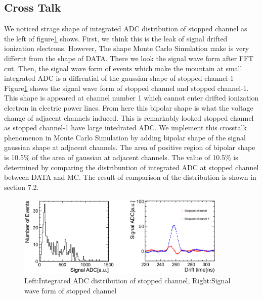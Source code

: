 \subsection{Cross Talk}

We noticed strage shape of integrated ADC distribution of stopped channel
as the left of figure\ref{cross_talk} shows.
First, we think this is the leak of signal drifted ionization electrons.
However, The shape Monte Carlo Simulation make is very differnt from the shape of DATA.
There we look the signal wave form after FFT cut.
Then, the signal wave form of events which make the mountain
at small integrated ADC is a diffrential of the gaussian shape of stopped channel-1
Figure\ref{cross_talk} shows the signal wave form of stopped channel and stopped channel-1.
This shape is appeared at channel number 1 which cannot enter drifted ionization electron in electric power lines.
From here this bipolar shape is what the voltage change of adjacent channels induced.
This is remarkably looked stopped channel as stopped channel-1 have large intedrated ADC.
We implement this crosstalk phenomenon in Monte Carlo Simulation
by adding bipolar shape of the signal gaussian shape at adjacent channels.
The area of positive region of bipolar shape is 10.5\% of the area of gaussian at adjacent channels.  
The value of 10.5\% is determined by comparing the distribuntion of integrated ADC at stopped channel
between DATA and MC.
The result of comparison of the distribution is shown in section 7.2.

\begin{figure}[htbp]
  \centering
  \includegraphics[width=10cm,clip]{fig/cross_talk.eps}
  \caption{Left:Integrated ADC distribution of stopped channel, Right:Signal wave form of stopped channel}
  \label{cross_talk}
\end{figure}

